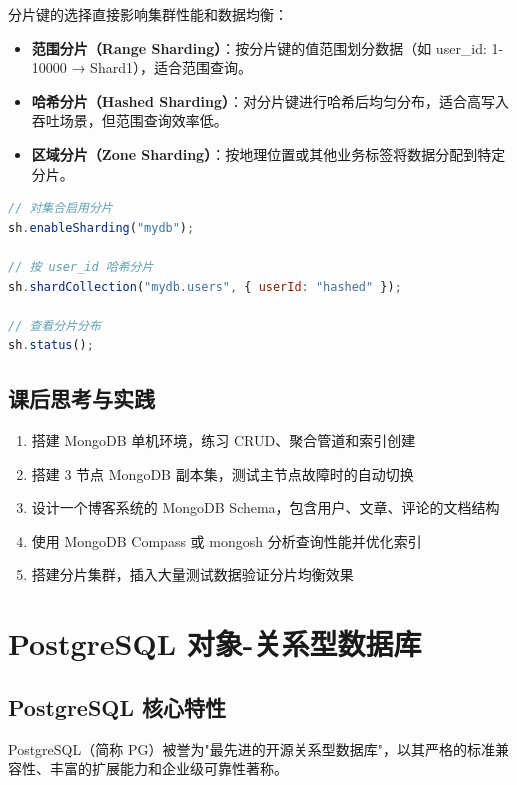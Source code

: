 \documentclass[12pt,UTF8]{ctexbook}
\begin{document}
分片键的选择直接影响集群性能和数据均衡：
\begin{itemize}
    \item \textbf{范围分片（Range Sharding）}：按分片键的值范围划分数据（如 user\_id: 1-10000 → Shard1），适合范围查询。
    \item \textbf{哈希分片（Hashed Sharding）}：对分片键进行哈希后均匀分布，适合高写入吞吐场景，但范围查询效率低。
    \item \textbf{区域分片（Zone Sharding）}：按地理位置或其他业务标签将数据分配到特定分片。
\end{itemize}

\begin{lstlisting}[language=javascript]
// 对集合启用分片
sh.enableSharding("mydb");

// 按 user_id 哈希分片
sh.shardCollection("mydb.users", { userId: "hashed" });

// 查看分片分布
sh.status();
\end{lstlisting}

\section{课后思考与实践}
\label{sec:mongodb-practice}
\begin{enumerate}
    \item 搭建 MongoDB 单机环境，练习 CRUD、聚合管道和索引创建
    \item 搭建 3 节点 MongoDB 副本集，测试主节点故障时的自动切换
    \item 设计一个博客系统的 MongoDB Schema，包含用户、文章、评论的文档结构
    \item 使用 MongoDB Compass 或 mongosh 分析查询性能并优化索引
    \item 搭建分片集群，插入大量测试数据验证分片均衡效果
\end{enumerate}

\chapter{PostgreSQL 对象-关系型数据库}
\label{chap:postgresql}

\section{PostgreSQL 核心特性}
\label{sec:postgresql-core}

PostgreSQL（简称 PG）被誉为"最先进的开源关系型数据库"，以其严格的标准兼容性、丰富的扩展能力和企业级可靠性著称。
\end{document}
